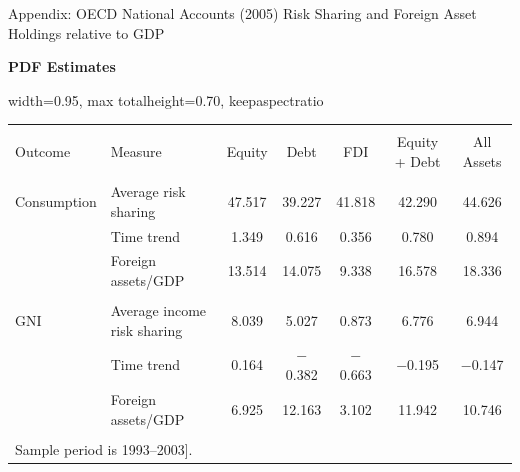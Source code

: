 \documentclass[aspectratio=169, 10pt]{beamer}
\begin{document}
  \begin{frame}[label=appendix:oecd2005_assets]{Appendix: OECD National Accounts (2005) Risk Sharing and Foreign Asset Holdings relative to GDP}
  \centering
  
  \begingroup
  \scriptsize
  \setlength{\tabcolsep}{3pt}
  \renewcommand{\arraystretch}{0.85}
  
  \vspace{0.10cm}
  
  {\large \textbf{PDF Estimates}}
  
  \vspace{0.15cm}
  
  \begin{adjustbox}{
    width=0.95\textwidth,
    max totalheight=0.70\textheight,
    keepaspectratio
  }
  \begin{tabular}{@{\extracolsep{5pt}}llccccc}
  \\[-1.8ex]\hline
  \hline \\[-1.8ex]
  Outcome 
  & Measure
  & Equity 
  & Debt 
  & FDI 
  & Equity + Debt 
  & All Assets \\
  \hline \\[-1.8ex]
  
  Consumption 
  & Average risk sharing 
  & 47.517 
  & 39.227 
  & 41.818 
  & 42.290 
  & 44.626 \\
  
  & Time trend 
  & 1.349 
  & 0.616 
  & 0.356 
  & 0.780 
  & 0.894 \\
  
  & Foreign assets/GDP 
  & 13.514 
  & 14.075 
  & 9.338 
  & 16.578 
  & 18.336 \\
  
  \hline \\[-1.8ex]
  
  GNI 
  & Average income risk sharing 
  & 8.039 
  & 5.027 
  & 0.873 
  & 6.776 
  & 6.944 \\
  
  & Time trend 
  & 0.164 
  & $-$0.382 
  & $-$0.663 
  & $-$0.195 
  & $-$0.147 \\
  
  & Foreign assets/GDP 
  & 6.925 
  & 12.163 
  & 3.102 
  & 11.942 
  & 10.746 \\
  
  \hline \\[-1.8ex]
  \multicolumn{7}{l}{Sample period is 1993--2003].} \\
  \end{tabular}
  \end{adjustbox}
  
  \endgroup
  
  \end{frame}
\end{document}
